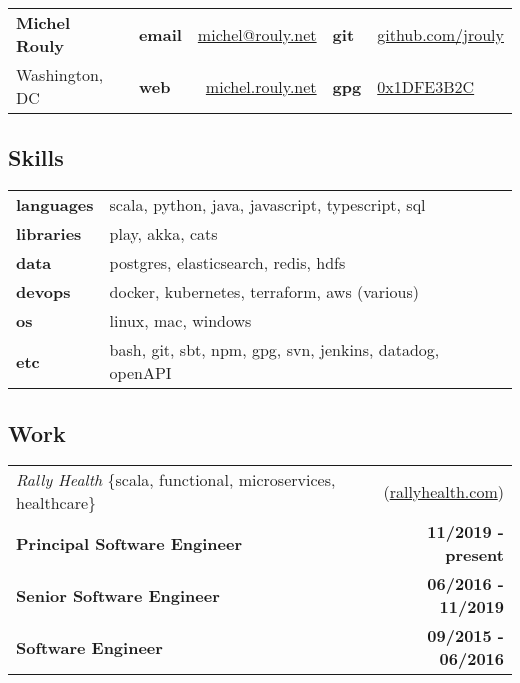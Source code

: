 \documentclass[10pt,letterpaper]{article}
\begin{document}
\setcounter{secnumdepth}{0}

\noindent
\begin{tabularx}{\textwidth}{@{} l X lr lX @{}}
  {\Large\textbf{Michel Rouly}} & &
      \textbf{email} & \href{mailto:michel@rouly.net}{michel@rouly.net} &
      \textbf{git} & \href{https://github.com/jrouly}{github.com/jrouly} \\
  {Washington, DC} & &
      \textbf{web} & \href{https://michel.rouly.net}{michel.rouly.net} &
      \textbf{gpg} & \href{http://keys.gnupg.net/pks/lookup?op=get\&search=0x68E925EE1DFE3B2C}{0x1DFE3B2C} \\
\end{tabularx}

\subsection{Skills}

\noindent
\begin{tabularx}{\textwidth}{@{} lX @{}}
  \textbf{languages} & scala, python, java, javascript, typescript, sql \\
  \textbf{libraries} & play, akka, cats \\
  \textbf{data} & postgres, elasticsearch, redis, hdfs \\
  \textbf{devops} & docker, kubernetes, terraform, aws (various) \\
  \textbf{os} & linux, mac, windows \\
  \textbf{etc} & bash, git, sbt, npm, gpg, svn, jenkins, datadog, openAPI
\end{tabularx}

\subsection{Work}

\noindent\begin{tabularx}{\textwidth}{@{} Xr @{}}
  \textit{Rally Health} \{scala, functional, microservices, healthcare\} & (\href{https://www.rallyhealth.com}{rallyhealth.com}) \\
  \textbf{Principal Software Engineer} & \textbf{11/2019 - present} \\
  \textbf{Senior Software Engineer} & \textbf{06/2016 - 11/2019} \\
  \textbf{Software Engineer} & \textbf{09/2015 - 06/2016} \\
\end{tabularx}
\end{document}
